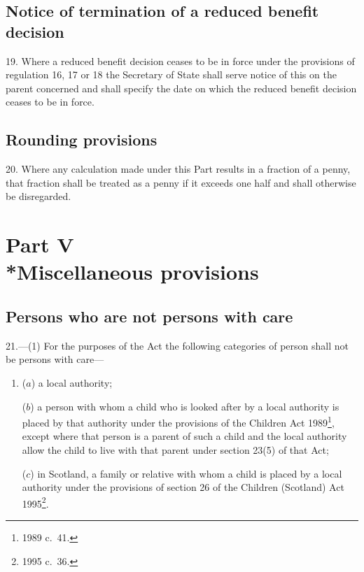 \documentclass[12pt,a4paper]{article}
\begin{document}
\subsection[19. Notice of termination of a reduced benefit decision]{Notice of termination of a reduced benefit decision}

19.  Where a reduced benefit decision ceases to be in force under the provisions of regulation 16, 17 or 18 the Secretary of State shall serve notice of this on the parent concerned and shall specify the date on which the reduced benefit decision ceases to be in force.

\subsection[20. Rounding provisions]{Rounding provisions}

20.  Where any calculation made under this Part results in a fraction of a penny, that fraction shall be treated as a penny if it exceeds one half and shall otherwise be disregarded.

\section[Part V --- Miscellaneous provisions]{Part V\\*Miscellaneous provisions}

\renewcommand\parthead{--- Part V}

\subsection[21. Persons who are not persons with care]{Persons who are not persons with care}

21.---(1)  For the purposes of the Act the following categories of person shall not be persons with care—
\begin{enumerate}\item[]
($a$) a local authority;

($b$) a person with whom a child who is looked after by a local authority is placed by that authority under the provisions of the Children Act 1989\footnote{1989 c.\ 41.}, except where that person is a parent of such a child and the local authority allow the child to live with that parent under section 23(5) of that Act;

($c$) in Scotland, a family or relative with whom a child is placed by a local authority under the provisions of section 26 of the Children (Scotland) Act 1995\footnote{1995 c.\ 36.}.
\end{enumerate}
\end{document}
